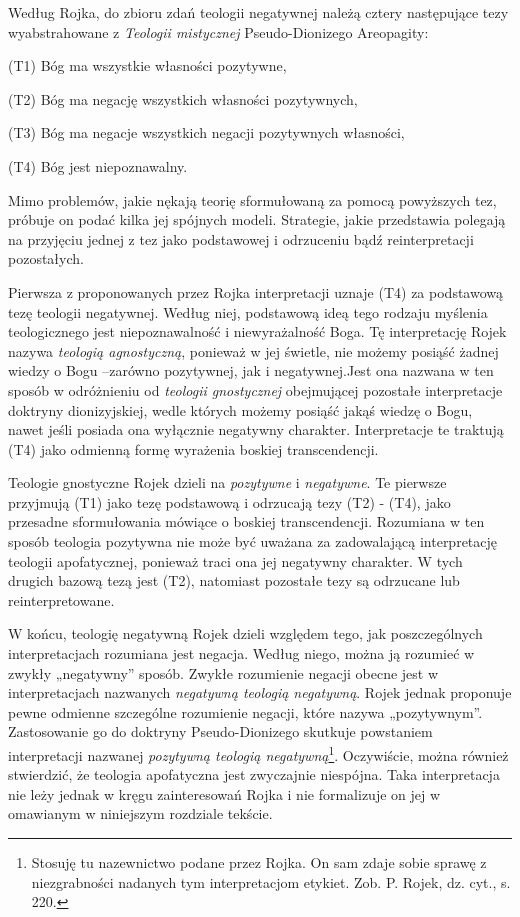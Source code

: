 Według Rojka, do zbioru zdań teologii negatywnej należą cztery
następujące tezy wyabstrahowane z \textit{Teologii mistycznej}
Pseudo-Dionizego Areopagity:


\bigskip

\noindent (T1) Bóg ma wszystkie własności pozytywne,

\noindent (T2) Bóg ma negację wszystkich własności pozytywnych,

\noindent (T3) Bóg ma negacje wszystkich negacji pozytywnych własności,

\noindent (T4) Bóg jest niepoznawalny.


\bigskip

Mimo problemów, jakie nękają teorię sformułowaną za pomocą powyższych
tez, próbuje on podać kilka jej spójnych modeli. Strategie, jakie
przedstawia polegają na przyjęciu jednej z tez jako podstawowej i
odrzuceniu bądź reinterpretacji pozostałych.

Pierwsza z proponowanych przez Rojka interpretacji uznaje (T4) za
podstawową tezę teologii negatywnej. Według niej, podstawową ideą tego
rodzaju myślenia teologicznego jest niepoznawalność i niewyrażalność
Boga. Tę interpretację Rojek nazywa \textit{teologią agnostyczną},
ponieważ w jej świetle, nie możemy posiąść żadnej wiedzy o Bogu
–zarówno pozytywnej, jak i negatywnej.Jest ona nazwana w ten sposób w
odróżnieniu od \textit{teologii gnostycznej} obejmującej pozostałe
interpretacje doktryny dionizyjskiej, wedle których możemy posiąść
jakąś wiedzę o Bogu, nawet jeśli posiada ona wyłącznie negatywny
charakter. Interpretacje te traktują (T4) jako odmienną formę wyrażenia
boskiej transcendencji.

Teologie gnostyczne Rojek dzieli na \textit{pozytywne} i
\textit{negatywne}. Te pierwsze przyjmują (T1) jako tezę podstawową i
odrzucają tezy (T2) - (T4), jako przesadne sformułowania mówiące o
boskiej transcendencji. Rozumiana w ten sposób teologia pozytywna nie
może być uważana za zadowalającą interpretację teologii apofatycznej,
ponieważ traci ona jej negatywny charakter. W tych drugich bazową tezą
jest (T2), natomiast pozostałe tezy są odrzucane lub reinterpretowane.

W końcu, teologię negatywną Rojek dzieli względem tego, jak
poszczególnych interpretacjach rozumiana jest negacja. Według niego,
można ją rozumieć w zwykły „negatywny” sposób. Zwykłe rozumienie
negacji obecne jest w interpretacjach nazwanych \textit{negatywną
teologią negatywną}. Rojek jednak proponuje pewne odmienne szczególne
rozumienie negacji, które nazywa „pozytywnym”. Zastosowanie go do
doktryny Pseudo-Dionizego skutkuje powstaniem interpretacji nazwanej
\textit{pozytywną teologią negatywną}\footnote{Stosuję tu nazewnictwo
podane przez Rojka. On sam zdaje sobie sprawę z niezgrabności nadanych
tym interpretacjom etykiet. Zob. P. Rojek, dz. cyt., s. 220. }.
Oczywiście, można również stwierdzić, że teologia apofatyczna jest
zwyczajnie niespójna. Taka interpretacja nie leży jednak w kręgu
zainteresowań Rojka i nie formalizuje on jej w omawianym w niniejszym
rozdziale tekście.


